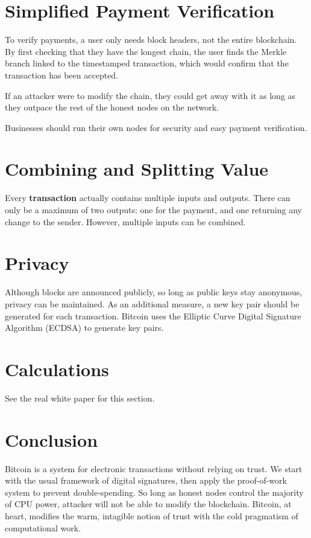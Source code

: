 \documentclass[11pt, letterpaper]{template}
\begin{document}
\section{Simplified Payment Verification}

To verify payments, a user only needs block headers, not the entire blockchain. By first checking that they have the longest chain, the user finds the Merkle branch linked to the timestamped transaction, which would confirm that the transaction has been accepted.

If an attacker were to modify the chain, they could get away with it as long as they outpace the rest of the honest nodes on the network.

Businesses should run their own nodes for security and easy payment verification.

\section{Combining and Splitting Value}

Every \textbf{transaction} actually contains multiple inputs and outputs. There can only be a maximum of two outputs: one for the payment, and one returning any change to the sender. However, multiple inputs can be combined.

\section{Privacy}

Although blocks are announced publicly, so long as public keys stay anonymous, privacy can be maintained. As an additional measure, a new key pair should be generated for each transaction. Bitcoin uses the Elliptic Curve Digital Signature Algorithm (ECDSA) to generate key pairs.

\section{Calculations}

See the real white paper for this section.

\section{Conclusion}

Bitcoin is a system for electronic transactions without relying on trust. We start with the usual framework of digital signatures, then apply the proof-of-work system to prevent double-spending. So long as honest nodes control the majority of CPU power, attacker will not be able to modify the blockchain. Bitcoin, at heart, modifies the warm, intagible notion of trust with the cold pragmatism of computational work.
\end{document}
